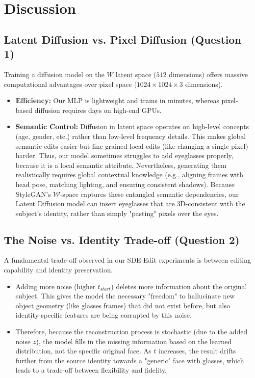 \documentclass[12pt]{article}
\begin{document}
\section{Discussion}

\subsection{Latent Diffusion vs. Pixel Diffusion (Question 1)}
Training a diffusion model on the $W$ latent space ($512$ dimensions) offers massive computational advantages over pixel space ($1024 \times 1024 \times 3$ dimensions). 
\begin{itemize}
    \item \textbf{Efficiency:} Our MLP is lightweight and trains in minutes, whereas pixel-based diffusion requires days on high-end GPUs.
    \item \textbf{Semantic Control:} Diffusion in latent space operates on high-level concepts (age, gender, etc.) rather than low-level frequency details. This makes global semantic edits easier but fine-grained local edits (like changing a single pixel) harder. Thus, our model sometimes struggles to add eyeglasses properly, because it is a local semantic attribute. Nevertheless, generating them realistically requires global contextual knowledge (e.g., aligning frames with head pose, matching lighting, and ensuring consistent shadows). Because StyleGAN's $\mathcal{W}$-space captures these entangled semantic dependencies, our Latent Diffusion model can insert eyeglasses that are 3D-consistent with the subject's identity, rather than simply "pasting" pixels over the eyes.
\end{itemize}

\subsection{The Noise vs. Identity Trade-off (Question 2)}
A fundamental trade-off observed in our SDE-Edit experiments is between editing capability and identity preservation.
\begin{itemize}
    \item Adding more noise (higher $t_{start}$) deletes more information about the original subject. This gives the model the necessary "freedom" to hallucinate new object geometry (like glasses frames) that did not exist before, but also identity-specific features are being corrupted by this noise.
    \item Therefore, because the reconstruction process is stochastic (due to the added noise $z$), the model fills in the missing information based on the learned distribution, not the specific original face. As $t$ increases, the result drifts further from the source identity towards a "generic" face with glasses, which leads to a trade-off between flexibility and fidelity.
\end{itemize}
\end{document}
